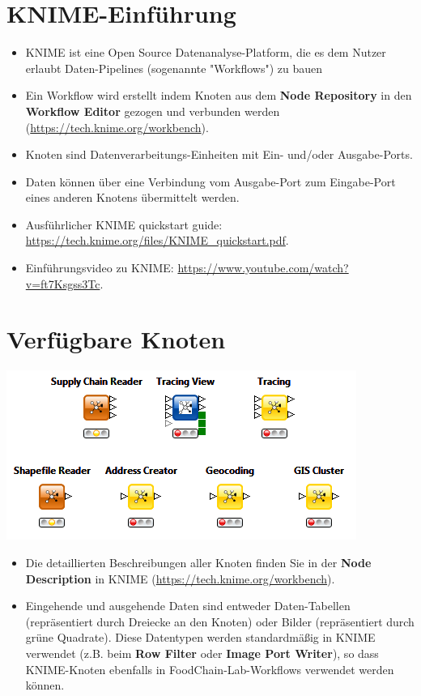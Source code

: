 \documentclass{beamer}
\begin{document}
\section{KNIME-Einführung}
\begin{frame}
	\begin{itemize}
		\item KNIME ist eine Open Source Datenanalyse-Platform, die es dem Nutzer erlaubt Daten-Pipelines (sogenannte "Workflows") zu bauen
		\item Ein Workflow wird erstellt indem Knoten aus dem \textbf{Node Repository} in den \textbf{Workflow Editor} gezogen und verbunden werden (\url{https://tech.knime.org/workbench}).
		\item Knoten sind Datenverarbeitungs-Einheiten mit Ein- und/oder Ausgabe-Ports.
		\item Daten können über eine Verbindung vom Ausgabe-Port zum Eingabe-Port eines anderen Knotens übermittelt werden.
		\item Ausführlicher KNIME quickstart guide: \url{https://tech.knime.org/files/KNIME_quickstart.pdf}.
		\item Einführungsvideo zu KNIME: \url{https://www.youtube.com/watch?v=ft7Ksgss3Tc}.
	\end{itemize}
\end{frame}

\section{Verfügbare Knoten}
\begin{frame}
	\begin{center}
  		\includegraphics[height=0.4\textheight]{1.png}
	\end{center}
	\begin{itemize}
		\item Die detaillierten Beschreibungen aller Knoten finden Sie in der \textbf{Node Description} in KNIME (\url{https://tech.knime.org/workbench}).
		\item Eingehende und ausgehende Daten sind entweder Daten-Tabellen (repräsentiert durch Dreiecke an den Knoten) oder Bilder (repräsentiert durch grüne Quadrate). Diese Datentypen werden standardmäßig in KNIME verwendet (z.B. beim \textbf{Row Filter} oder \textbf{Image Port Writer}), so dass KNIME-Knoten ebenfalls in FoodChain-Lab-Workflows verwendet werden können.
	\end{itemize}
\end{frame}
 
\end{document}
